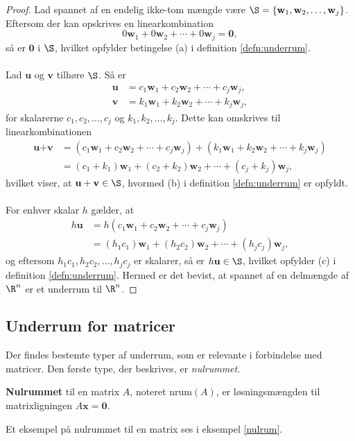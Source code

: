 \begin{proof}
Lad spannet af en endelig ikke-tom mængde være 
$\S=\{\textbf{w}_1 , \textbf{w}_2 , \ldots , \textbf{w}_j\}$.
Eftersom der kan opskrives en linearkombination 
$$0\textbf{w}_1 + 0\textbf{w}_2 + \cdots + 0\textbf{w}_j=\textbf{0},$$ 
så er $\textbf{0}$ i  $\S$, hvilket opfylder betingelse (a) i definition \ref{defn:underrum}.
\\\\
%
Lad $\textbf{u}$ og $\textbf{v}$ tilhøre $\S$. Så er
%
\begin{align*}
\textbf{u}&=c_1\textbf{w}_1+c_2\textbf{w}_2+\cdots+c_j\textbf{w}_j, \\ 
\textbf{v}&=k_1\textbf{w}_1+k_2\textbf{w}_2+\cdots+k_j\textbf{w}_j,
\end{align*}
%
for skalarerne $c_1,c_2,\ldots,c_j$ og $k_1,k_2,\ldots,k_j$. 
Dette kan omskrives til linearkombinationen
%
\begin{align*}
\textbf{u}+\textbf{v}&=(c_1\textbf{w}_1+c_2\textbf{w}_2+\cdots+c_j\textbf{w}_j)+(k_1\textbf{w}_1+k_2\textbf{w}_2+\cdots+k_j\textbf{w}_j)\\
&=(c_1+k_1)\textbf{w}_1+(c_2+k_2)\textbf{w}_2+\cdots+(c_j+k_j)\textbf{w}_j,
\end{align*}
hvilket viser, at $\textbf{u}+\textbf{v}\in \S$, hvormed (b) i definition \ref{defn:underrum} er opfyldt.
\\\\
For enhver skalar $h$ gælder, at
\begin{align*}
h\textbf{u}&=h(c_1\textbf{w}_1+c_2\textbf{w}_2+\cdots+c_j\textbf{w}_j)\\
&=(h_1c_1)\textbf{w}_1+(h_2c_2)\textbf{w}_2+\cdots+(h_jc_j)\textbf{w}_j,
\end{align*}
og eftersom $h_1c_1,h_2c_2,\ldots,h_jc_j$ er skalarer, så er $h\textbf{u}\in \S$, hvilket opfylder (c) i definition \ref{defn:underrum}.
Hermed er det bevist, at spannet af en delmængde af $\R^n$ er et underrum til $\R^n$.
\end{proof}

\subsection{Underrum for matricer}
Der findes bestemte typer af underrum, som er relevante i forbindelse med matricer. Den første type, der beskrives, er \textit{nulrummet}.
%
\begin{defn}{}{}
\textbf{Nulrummet} til en matrix $A$, noteret $\text{nrum}(A)$, er løsningsmængden til matrixligningen $A\textbf{x}=\textbf{0}$. 
\end{defn}
%
\noindent
Et eksempel på nulrummet til en matrix ses i eksempel \ref{nulrum}.


